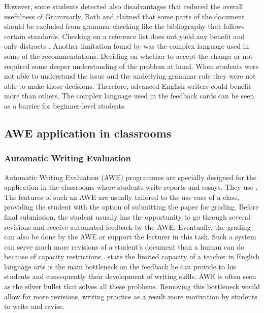 \documentclass[runningheads]{llncs}
\begin{document}
However, some students detected also disadvantages that reduced the overall usefulness of Grammarly. Both \citeauthor{ventayen_graduate_2018} and  \citeauthor{nova_utilizing_2018} claimed that some parts of the document should be excluded from grammar checking like the bibliography that follows certain standards. Checking on a reference list does not yield any benefit and only distracts \citep{ventayen_graduate_2018, nova_utilizing_2018}. Another limitation found by \textcite{cavaleri_you_2016} was the complex language used in some of the recommendations. Deciding on whether to accept the change or not required some deeper understanding of the problem at hand. When students were not able to understand the issue and the underlying grammar rule they were not able to make those decisions. Therefore, advanced English writers could benefit more than others. The complex language used in the feedback cards can be seen as a barrier for beginner-level students. 

\subsection{AWE application in classrooms}
\subsubsection{Automatic Writing Evaluation}
Automatic Writing Evaluation (AWE) programmes are specially designed for the application in the classrooms where students write reports and essays. They use  .
The features of such an AWE are usually tailored to the use case of a class, providing the student with the option of submitting the paper for grading. Before final submission, the student usually has the opportunity to go through several revisions and receive automated feedback by the AWE. Eventually, the grading can also be done by the AWE or support the lecturer in this task. Such a system can serve much more revisions of a student's document than a human can do because of capacity restrictions \citep{warschauer_automated_2006}. \textcite{grimes_utility_2010} state the limited capacity of a teacher in English language arts is the main bottleneck on the feedback he can provide to his students and consequently their development of writing skills. AWE is often seen as the silver bullet that solves all these problems. Removing this bottleneck would allow for more revisions, writing practice as a result more motivation by students to write and revise.        
\end{document}
